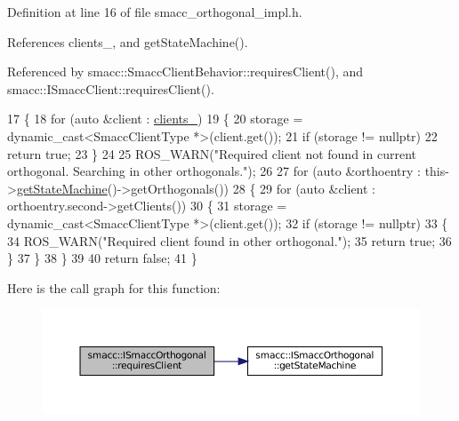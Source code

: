Definition at line 16 of file smacc\+\_\+orthogonal\+\_\+impl.\+h.



References clients\+\_\+, and get\+State\+Machine().



Referenced by smacc\+::\+Smacc\+Client\+Behavior\+::requires\+Client(), and smacc\+::\+I\+Smacc\+Client\+::requires\+Client().


\begin{DoxyCode}
17 \{
18     \textcolor{keywordflow}{for} (\textcolor{keyword}{auto} &client : \hyperlink{classsmacc_1_1ISmaccOrthogonal_a0f270e9c8c126198f6bce542ab4e04ba}{clients\_})
19     \{
20         storage = \textcolor{keyword}{dynamic\_cast<}SmaccClientType *\textcolor{keyword}{>}(client.get());
21         \textcolor{keywordflow}{if} (storage != \textcolor{keyword}{nullptr})
22             \textcolor{keywordflow}{return} \textcolor{keyword}{true};
23     \}
24 
25     ROS\_WARN(\textcolor{stringliteral}{"Required client not found in current orthogonal. Searching in other orthogonals."});
26 
27     \textcolor{keywordflow}{for} (\textcolor{keyword}{auto} &orthoentry : this->\hyperlink{classsmacc_1_1ISmaccOrthogonal_aae265ec480b8ed552ddc79afd2d93a62}{getStateMachine}()->getOrthogonals())
28     \{
29         \textcolor{keywordflow}{for} (\textcolor{keyword}{auto} &client : orthoentry.second->getClients())
30         \{
31             storage = \textcolor{keyword}{dynamic\_cast<}SmaccClientType *\textcolor{keyword}{>}(client.get());
32             \textcolor{keywordflow}{if} (storage != \textcolor{keyword}{nullptr})
33             \{
34                 ROS\_WARN(\textcolor{stringliteral}{"Required client found in other orthogonal."});
35                 \textcolor{keywordflow}{return} \textcolor{keyword}{true};
36             \}
37         \}
38     \}
39 
40     \textcolor{keywordflow}{return} \textcolor{keyword}{false};
41 \}
\end{DoxyCode}
Here is the call graph for this function\+:
\nopagebreak
\begin{figure}[H]
\begin{center}
\leavevmode
\includegraphics[width=350pt]{classsmacc_1_1ISmaccOrthogonal_a602e16b09f8a1b3de889f2f3d90a3211_cgraph}
\end{center}
\end{figure}

